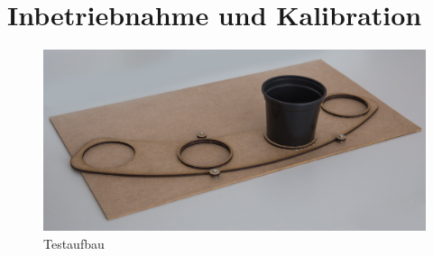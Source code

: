 \newpage
\section{Inbetriebnahme und Kalibration}

\begin{figure}[H]
	\includegraphics[width=1\textwidth]{Illustrationen/7-Inbetriebnahme_und_Kalibration/testaufbau.jpg}
	\caption{Testaufbau}
	\label{fig:testaufbau}
\end{figure}